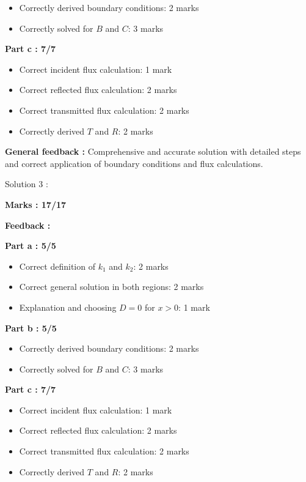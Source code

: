 \documentclass[a4paper,11pt]{article}
\begin{document}
\begin{itemize}
    \item Correctly derived boundary conditions: 2 marks
    \item Correctly solved for $B$ and $C$: 3 marks
\end{itemize}

\textbf{Part c : 7/7}

\begin{itemize}
    \item Correct incident flux calculation: 1 mark
    \item Correct reflected flux calculation: 2 marks
    \item Correct transmitted flux calculation: 2 marks
    \item Correctly derived $T$ and $R$: 2 marks
\end{itemize}

\textbf{General feedback :}
Comprehensive and accurate solution with detailed steps and correct application of boundary conditions and flux calculations.


Solution 3 :

\textbf{Marks : 17/17}

\textbf{Feedback :}

\textbf{Part a : 5/5}

\begin{itemize}
    \item Correct definition of $k_1$ and $k_2$: 2 marks
    \item Correct general solution in both regions: 2 marks
    \item Explanation and choosing $D = 0$ for $x>0$: 1 mark
\end{itemize}

\textbf{Part b : 5/5}

\begin{itemize}
    \item Correctly derived boundary conditions: 2 marks
    \item Correctly solved for $B$ and $C$: 3 marks
\end{itemize}

\textbf{Part c : 7/7}

\begin{itemize}
    \item Correct incident flux calculation: 1 mark
    \item Correct reflected flux calculation: 2 marks
    \item Correct transmitted flux calculation: 2 marks
    \item Correctly derived $T$ and $R$: 2 marks
\end{itemize}
\end{document}
